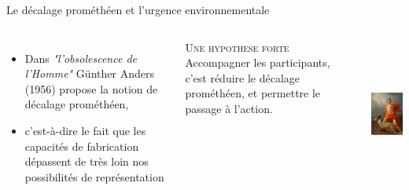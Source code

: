 \documentclass[newPxFont]{beamer}
\begin{document}
  \begin{frame}[c]{Le décalage prométhéen et l'urgence environnementale}
    \vspace{-1cm}
    \begin{columns}[onlytextwidth,T]
      \column{\dimexpr\linewidth-30mm-5mm}
      \begin{itemize}
        \item Dans \textit{"l'obsolescence de l'Homme"} Günther Anders (1956) propose la notion de décalage prométhéen,
        \item c'est-à-dire le fait que les capacités de fabrication dépassent de très loin nos possibilités de représentation
      \end{itemize}

      \small{
        \begin{alertblock}{\textsc{Une hypothese forte}}
          Accompagner les participants, c'est réduire le décalage prométhéen, et permettre le passage à l'action.
        \end{alertblock}
      }
      \column{30mm}
      \includegraphics[height=5cm]{img/promethee.jpg}
    \end{columns}
  \end{frame}
\end{document}
